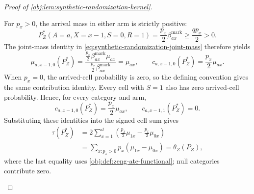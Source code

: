 \begin{proof}[Proof of \cref{obj:lem:synthetic-randomization-kernel}]
\begin{enumerate}
For \(p_x>0\), the arrival mass in either arm is strictly positive:
\[
P_Z^*(A=a,X=x-1,S=0,R=1)
=
\frac{p_x}{2}\beta^{\mathrm{mark}}_{ax}
\ge\frac{qp_x}{2}>0.
\]
The joint-mass identity in \cref{eq:synthetic-randomization-joint-mass} therefore yields
\[
\mu_{a,x-1,0}(P_Z^*)
=
\frac{\frac{p_x}{2}\beta^{\mathrm{mark}}_{ax}\mu_{ax}}
     {\frac{p_x}{2}\beta^{\mathrm{mark}}_{ax}}
=\mu_{ax},
\qquad
c_{a,x-1,0}(P_Z^*)=\frac{p_x}{2}\mu_{ax}.
\]
When \(p_x=0\), the arrived-cell probability is zero, so the defining convention gives the same contribution identity. Every cell with \(S=1\) also has zero arrived-cell probability. Hence, for every category and arm,
\[
c_{a,x-1,0}(P_Z^*)=\frac{p_x}{2}\mu_{ax},
\qquad
c_{a,x-1,1}(P_Z^*)=0.
\]
Substituting these identities into the signed cell sum gives
\[
\begin{aligned}
\tau(P_Z^*)
&=2\sum_{x=1}^d
\left(\frac{p_x}{2}\mu_{1x}
-\frac{p_x}{2}\mu_{0x}\right)\\
&=\sum_{x:p_x>0}p_x(\mu_{1x}-\mu_{0x})
=\theta_Z(P_Z),
\end{aligned}
\]
where the last equality uses \cref{obj:def:zeng-ate-functional}; null categories contribute zero.
\end{enumerate}
\end{proof}
